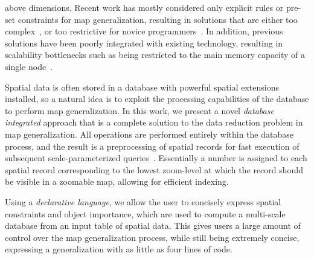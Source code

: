 above dimensions. Recent work has mostly considered only explicit rules or pre-set constraints for map generalization, resulting in solutions that are either too complex~\cite{sld,mapnik}, or too restrictive for novice programmers~\cite{sarma2012fusiontables,nutanong2012multiresolution}. In addition, previous solutions have been poorly integrated with existing technology, resulting in scalability bottlenecks such as being restricted to the main memory capacity of a single node~\cite{sarma2012fusiontables}. 

Spatial data is often stored in a database with powerful spatial extensions installed, so a natural idea is to exploit the processing capabilities of the database to perform map generalization. In this work, we present a novel \emph{database integrated} approach that is a complete solution to the data reduction problem in map generalization. All operations are performed entirely within the database process, and the result is a preprocessing of spatial records for fast execution of subsequent scale-parameterized queries~\cite{hilbert1891ueber}. Essentially a number is assigned to each spatial record corresponding to the lowest zoom-level at which the record should be visible in a zoomable map, allowing for efficient indexing.

Using a \emph{declarative language}, we allow the user to concisely express spatial constraints and object importance, which are used to compute a multi-scale database from an input table of spatial data. This gives users a large amount of control over the map generalization process, while still being extremely concise, expressing a generalization with as little as four lines of code.

